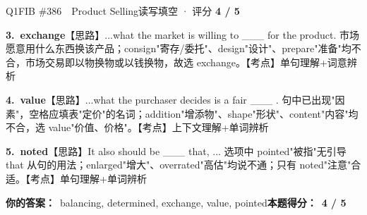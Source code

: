 \begin{qblock}{Q1\quad FIB \#386\ \ Product Selling}{读写填空 · 评分 \textcolor{cAccent}{\bfseries 4 / 5}}
\begin{notebox}
\textbf{3.\ exchange}\quad【思路】...what the market is willing to \_\_\_ for the product. 市场愿意用什么东西换该产品；consign"寄存/委托"、design"设计"、prepare"准备"均不合，市场交易即以物换物或以钱换物，故选 exchange。【考点】单句理解+词意辨析\par\smallskip
\textbf{4.\ value}\quad【思路】...what the purchaser decides is a fair \_\_\_ . 句中已出现"因素"，空格应填表"定价"的名词；addition"增添物"、shape"形状"、content"内容"均不合，选 value"价值、价格"。【考点】上下文理解+单词辨析\par\smallskip
\textbf{5.\ noted}\quad【思路】It also should be \_\_\_ that, ... 选项中 pointed"被指"无引导 that 从句的用法；enlarged"增大"、overrated"高估"均说不通；只有 noted"注意"合适。【考点】单句理解+单词辨析
\end{notebox}
\smallskip
\textbf{你的答案：}\ balancing, determined, exchange, value, {\color{cWrong}pointed}\qquad\textbf{本题得分：}\ {\color{cAccent}\bfseries 4 / 5}
\end{qblock}


